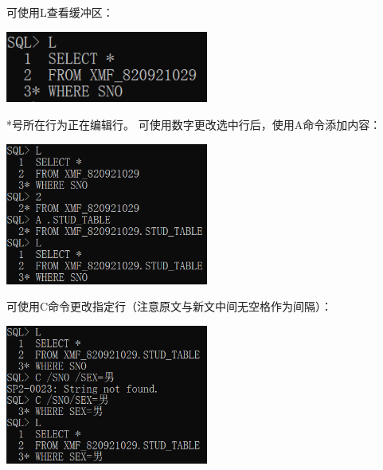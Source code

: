 \documentclass[11pt, a4paper, oneside, UTF8]{ctexbook}
\begin{document}
可使用L查看缓冲区：

\begin{center}
  \begin{minipage}{\textwidth}
    \center
    \includegraphics[width=0.5\textwidth]{picture/L命令效果.png}
    \captionsetup{hypcap=false}
    \label{fig:L命令效果}
  \end{minipage}
\end{center}

*号所在行为正在编辑行。
可使用数字更改选中行后，使用A命令添加内容：

\begin{center}
  \begin{minipage}{\textwidth}
    \center
    \includegraphics[width=0.5\textwidth]{picture/A命令效果.png}
    \captionsetup{hypcap=false}
    \label{fig:A命令效果}
  \end{minipage}
\end{center}

可使用C命令更改指定行（注意原文与新文中间无空格作为间隔）：

\begin{center}
  \begin{minipage}{\textwidth}
    \center
    \includegraphics[width=0.5\textwidth]{picture/C命令效果.png}
    \captionsetup{hypcap=false}
    \label{fig:C命令效果}
  \end{minipage}
\end{center}
\end{document}
